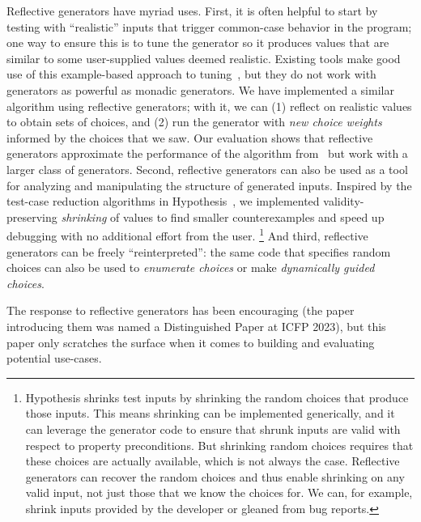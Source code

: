 Reflective generators have myriad uses. First,
%
it is often helpful to start by testing with
``realistic'' inputs that trigger common-case behavior in the program;
one way to ensure this is to tune the generator so
it produces values that are similar to some user-supplied values deemed
realistic. Existing tools make good use of this example-based approach to
tuning~\cite{soremekun2020inputs}, but they do not work with generators as
powerful as monadic generators. We have implemented a
similar algorithm using
reflective generators; with it, we can (1) reflect on realistic values to
obtain sets of choices, and (2) run the generator with {\em new choice weights}
informed by the choices that we saw. Our evaluation shows that reflective
generators approximate the performance of the algorithm
from~\cite{soremekun2020inputs} but work with a larger class of generators.
%
Second,
reflective generators can also be used as a tool for analyzing and
manipulating the structure of generated inputs. Inspired by the test-case
reduction algorithms in Hypothesis~\cite{maciver_test-case_2020}, we implemented
validity-preserving {\em shrinking} of values to find smaller counterexamples
and speed up debugging with no additional effort from the user.%
%
\footnote{%
\normalsize
Hypothesis shrinks test inputs by shrinking the random choices
that produce those
inputs. This means shrinking can be implemented
generically, and it can leverage the generator code to ensure that shrunk
inputs are valid with respect to property preconditions.  But shrinking
random choices requires that these choices are actually available, which
is not always the case. Reflective generators
can
recover the random choices and thus enable shrinking
on any
valid input, not just those that we know the choices for.  We can, for
example, shrink inputs provided by the developer or
gleaned from bug reports.  \iflater{}
 \fi}
%
And third, reflective generators can be freely
``reinterpreted'': the same code that specifies random choices can
also be used to {\em enumerate choices} or make {\em dynamically guided choices}.

%
The response to reflective generators has been encouraging (the paper
introducing them was named a Distinguished Paper at ICFP 2023), but
this paper only scratches the surface when it comes to building and
evaluating potential use-cases.

